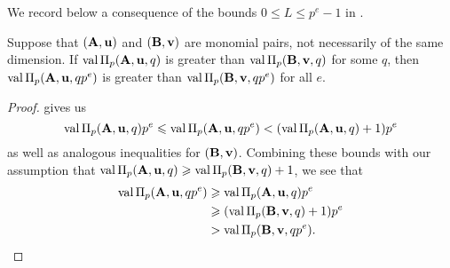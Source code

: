 \documentclass{amsart}
\begin{document}
We record below a consequence of the bounds $0 \le L \leq p^e-1$ in .

\begin{corollary}
   \label{cor: mu comparison}
   Suppose that $(\mathbf{A},\mathbf{u})$ and $(\mathbf{B},\mathbf{v})$ are monomial pairs, not necessarily of the same dimension.
   If $\operatorname{val} \Pi_p(\mathbf{A}, \mathbf{u}, q)$ is greater than $\operatorname{val} \Pi_p(\mathbf{B}, \mathbf{v}, q)$ for some $q$, then $\operatorname{val} \Pi_p(\mathbf{A}, \mathbf{u}, qp^e)$ is greater than $\operatorname{val} \Pi_p(\mathbf{B}, \mathbf{v}, qp^e)$ for all $e$.
\end{corollary}

\begin{proof}
    gives us
   \[
      \operatorname{val} \Pi_p(\mathbf{A}, \mathbf{u},q)p^e \leqslant \operatorname{val} \Pi_p(\mathbf{A}, \mathbf{u}, qp^e) < (\operatorname{val} \Pi_p(\mathbf{A}, \mathbf{u}, q)+1)p^e
   \]
   as well as analogous inequalities for $(\mathbf{B},\mathbf{v})$.
   Combining these bounds with our assumption that $\operatorname{val} \Pi_p(\mathbf{A}, \mathbf{u}, q) \geqslant \operatorname{val} \Pi_p(\mathbf{B}, \mathbf{v}, q) + 1$, we see that
   \begin{align*}
     \operatorname{val} \Pi_p(\mathbf{A}, \mathbf{u}, qp^e)  &\geqslant \operatorname{val} \Pi_p(\mathbf{A}, \mathbf{u}, q)  p^e \\
                                  &\geqslant (\operatorname{val} \Pi_p(\mathbf{B}, \mathbf{v}, q)+1) p^e \\
                                  & > \operatorname{val} \Pi_p(\mathbf{B}, \mathbf{v}, qp^e). \qedhere
   \end{align*}
\end{proof}

\end{document}
